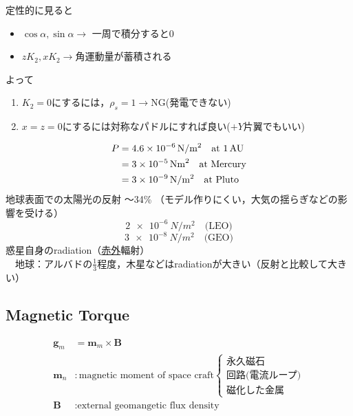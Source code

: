 \documentclass[class=article, crop=false, dvipdfmx, fleqn]{standalone}
\begin{document}
定性的に見ると
\begin{itemize}
\item $\cos\alpha,\sin\alpha\rightarrow$
一周で積分すると0
\item $zK_2,xK_2\rightarrow$角運動量が蓄積される
\end{itemize}
よって
\begin{enumerate}
\item $K_2=0$にするには，$\rho_s=1\rightarrow $NG(発電できない)
\item $x=z=0$にするには対称なパドルにすれば良い($+Y$片翼でもいい)
\end{enumerate}
\begin{align}
P & = \SI{4.6e-6}{N/m^2} \quad \text{at \SI{1}{AU}} \\
	& = \SI{3e-5}{N\m^2} \quad \text{at Mercury} \\
    & = \SI{3e-9}{N/m^2} \quad \text{at Pluto}
\end{align}
地球表面での太陽光の反射 ～34\% （モデル作りにくい，大気の揺らぎなどの影響を受ける）
\[ \SI{2e-6}{N/m^2} \quad \text{(LEO)} \]
\[ \SI{3e-8}{N/m^2} \quad \text{(GEO)} \]
惑星自身のradiation（\underline{赤外}輻射）\\
$\quad $地球：アルバドの$\frac{1}{3}$程度，木星などはradiationが大きい（反射と比較して大きい）


\subsection{Magnetic Torque}
\begin{align}
\bm{g}_m&=\bm{m}_m\times\bm{B}\\
\bm{m}_n&:\textrm{magnetic moment of space craft}
\begin{cases}
\text{永久磁石}\\
\text{回路(電流ループ)}\\
\text{磁化した金属}
\end{cases}\\
\bm{B}&:\textrm{external geomangetic flux density}
\end{align}


\end{document}
